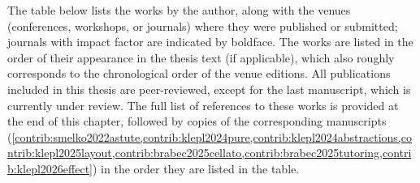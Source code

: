\label{chap:publist}

The table below lists the works by the author, along with the venues (conferences, workshops, or journals) where they were published or submitted; journals with impact factor are indicated by boldface. The works are listed in the order of their appearance in the thesis text (if applicable), which also roughly corresponds to the chronological order of the venue editions. All publications included in this thesis are peer-reviewed, except for the last manuscript, which is currently under review. The full list of references to these works is provided at the end of this chapter, followed by copies of the corresponding manuscripts (\cref{contrib:smelko2022astute,contrib:klepl2024pure,contrib:klepl2024abstractions,contrib:klepl2025layout,contrib:brabec2025cellato,contrib:brabec2025tutoring,contrib:klepl2026effect}) in the order they are listed in the table.

